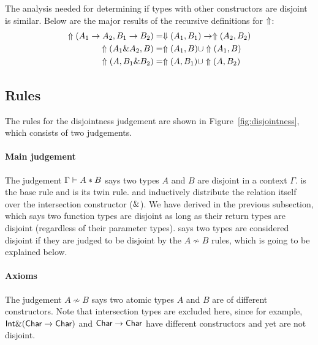 The analysis needed for determining if types with other constructors are
disjoint is similar. Below are the major results of the recursive definitions for
$\Uparrow$:
\begin{align*}
  \Uparrow(A_1 \to A_2, B_1 \to B_2) &= \Downarrow(A_1,B_1) \to \Uparrow(A_2,B_2) \\
  \Uparrow({A_1 \& A_2, B})      &= \Uparrow(A_1, B) \cup \Uparrow(A_1,B) \\
  \Uparrow({A, B_1 \& B_2})      &= \Uparrow(A, B_1) \cup \Uparrow(A,B_2)
\end{align*}

\subsection{Rules}

The rules for the disjointness judgement are shown in
Figure~\ref{fig:disjointness}, which consists of two judgements.

\paragraph{Main judgement} The judgement $\Gamma \vdash A * B$ says two types
$A$ and $B$ are disjoint in a context $\Gamma$. \label{DisjointVar} is the
base rule and \label{DisjointVar} is its twin rule.
\label{DisjointInter1} and \label{DisjointInter2} inductively distribute
the relation itself over the intersection constructor ($\&$). We have
derived \label{DisjointFun} in the previous subsection, which says two
function types are disjoint as long as their return types are disjoint
(regardless of their parameter types). \label{DisjointAtomic} says two types
are considered disjoint if they are judged to be disjoint by the $A \not \sim B$
rules, which is going to be explained below.

\paragraph{Axioms} The judgement $A \not \sim B$ says two atomic types $A$ and
$B$ are of different constructors. Note that intersection types are excluded
here, since for example, $\textsf{Int} \& (\textsf{Char} \to \textsf{Char})$ and $\textsf{Char} \to
\textsf{Char}$ have different constructors and yet are not disjoint.

